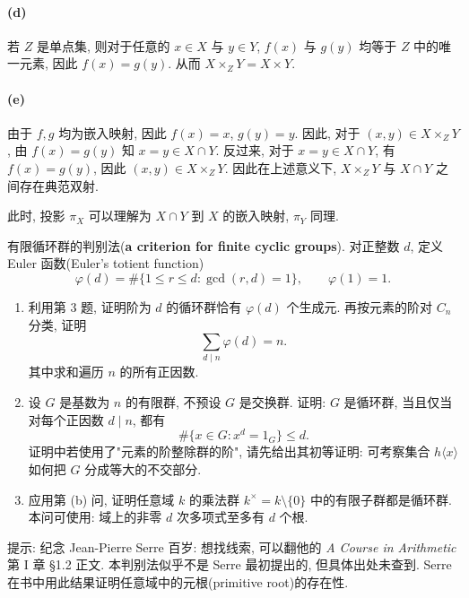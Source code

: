 \documentclass{article}
\begin{document}
\begin{solution}
	\paragraph{(d)} 若 $Z$ 是单点集, 则对于任意的 $x\in X$ 与 $y\in Y$, $f(x)$ 与 $g(y)$ 均等于 $Z$ 中的唯一元素, 因此 $f(x) = g(y)$. 从而 $X \times_Z Y = X \times Y$.

	\paragraph{(e)} 由于 $f,g$ 均为嵌入映射, 因此 $f(x) = x$, $g(y) = y$. 因此, 对于 $(x,y) \in X \times_Z Y$, 由 $f(x) = g(y)$ 知 $x=y \in X \cap Y$. 反过来, 对于 $x=y \in X \cap Y$, 有 $f(x) = g(y)$, 因此 $(x,y) \in X \times_Z Y$. 因此在上述意义下, $X \times_Z Y$ 与 $X \cap Y$ 之间存在典范双射.
	
	此时, 投影 $\pi_X$ 可以理解为 $X \cap Y$ 到 $X$ 的嵌入映射, $\pi_Y$ 同理.
\end{solution}



\begin{problem}
  {\heiti 有限循环群的判别法}(\textbf{a criterion for finite cyclic groups}). 对正整数 $d$, 定义 Euler 函数(Euler's totient function)
  \[
    \varphi(d)=\#\{1\leq r\leq d:\gcd(r,d)=1\},\qquad\varphi(1)=1.
  \]
  \begin{enumerate}
    \item[(a)] 利用第 3 题, 证明阶为 $d$ 的循环群恰有 $\varphi(d)$ 个生成元. 再按元素的阶对 $C_n$ 分类, 证明
      \[
        \sum_{d\mid n}\varphi(d)=n.
      \]
      其中求和遍历 $n$ 的所有正因数.
    \item[(b)] 设 $G$ 是基数为 $n$ 的有限群, 不预设 $G$ 是交换群. 证明: $G$ 是循环群, 当且仅当对每个正因数 $d\mid n$, 都有
      \[
        \#\{x\in G:x^d=1_G\}\leq d.
      \]
      证明中若使用了"元素的阶整除群的阶", 请先给出其初等证明: 可考察集合 $h\langle x\rangle$ 如何把 $G$ 分成等大的不交部分.
    \item[(c)] 应用第 (b) 问, 证明任意域 $k$ 的乘法群 $k^\times=k\setminus\{0\}$ 中的有限子群都是循环群. 本问可使用: 域上的非零 $d$ 次多项式至多有 $d$ 个根.
  \end{enumerate}
  提示: 纪念 Jean-Pierre Serre 百岁: 想找线索, 可以翻他的 \emph{A Course in Arithmetic} 第 I 章 §1.2 正文. 本判别法似乎不是 Serre 最初提出的, 但具体出处未查到. Serre 在书中用此结果证明任意域中的元根(primitive root)的存在性.
\end{problem}
\end{document}
